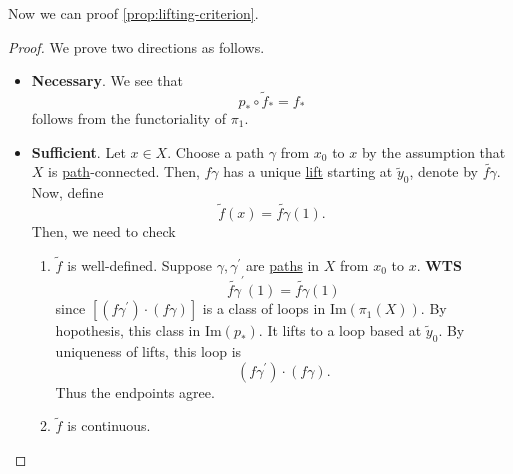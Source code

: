 Now we can proof \autoref{prop:lifting-criterion}.
\begin{proof}
	We prove two directions as follows.
	\begin{itemize}
		\item \textbf{Necessary}. We see that
		      \[
			      p_\ast \circ \widetilde{f} _\ast = f_\ast
		      \]
		      follows from the functoriality of \(\pi _1\).
		\item \textbf{Sufficient}. Let \(x\in X\). Choose a path \(\gamma\) from \(x_0\) to \(x\) by the assumption that \(X\) is \hyperref[def:path]{path}-connected.
		      Then, \(f \gamma \) has a unique \hyperref[prop:homotopy-lifting-property]{lift} starting at \(\widetilde{y} _0\), denote by \(\widetilde{f\gamma}\).
		      Now, define
		      \[
			      \widetilde{f} (x) = \widetilde{f \gamma } (1).
		      \]
		      Then, we need to check
		      \begin{enumerate}
			      \item \(\widetilde{f} \) is well-defined. Suppose \(\gamma , \gamma ^\prime \) are \hyperref[def:path]{paths} in \(X\) from \(x_0\)
			            to \(x\). \textbf{WTS}
			            \[
				            \widetilde{f \gamma } ^\prime (1) = \widetilde{f \gamma } (1)
			            \]
			            since \([(f \gamma ^\prime)\cdot (f \gamma ) ]\) is a class of loops in \(\mathrm{Im} (\pi _1(X))\). By hopothesis, this class in \(\mathrm{Im} (p_*)\).
			            It lifts to a loop based at \(\widetilde{y} _0\). By uniqueness of lifts, this loop is
			            \[
				            (f \gamma ^\prime )\cdot (f \gamma ).
			            \]
			            Thus the endpoints agree.
			            \begin{figure}[H]
				            \centering
				            \label{fig:pf:prop:lifting-criterion}
			            \end{figure}
			      \item \(\widetilde{f} \) is continuous.
		      \end{enumerate}

	\end{itemize}
\end{proof}